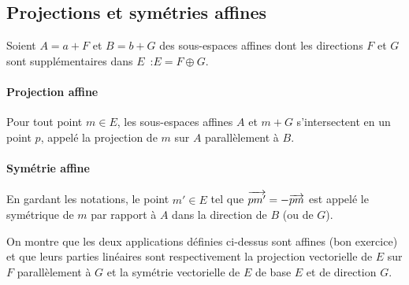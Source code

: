 \subsection{Projections et symétries affines}

Soient $A=a+F$ et $B=b+G$ des sous-espaces affines dont les directions $F$ et $G$ sont supplémentaires dans $E$~:$E=F\oplus G$.
\paragraph{Projection affine} Pour tout point $m \in E$, les sous-espaces affines $A$ et $m+G$ s'intersectent en un point $p$, appelé la projection de $m$ sur $A$ parallèlement à $B$.
\paragraph{Symétrie affine} En gardant les notations, le point $m' \in E$ tel que $\overrightarrow{pm'} = -\overrightarrow{pm}$ est appelé le symétrique de $m$ par rapport à $A$ dans la direction de $B$ (ou de $G$).

On montre que les deux applications définies ci-dessus sont affines (bon exercice) et que leurs parties linéaires sont respectivement la projection vectorielle de $E$ sur $F$ parallèlement à $G$ et la symétrie vectorielle de $E$ de base $E$ et de direction $G$.